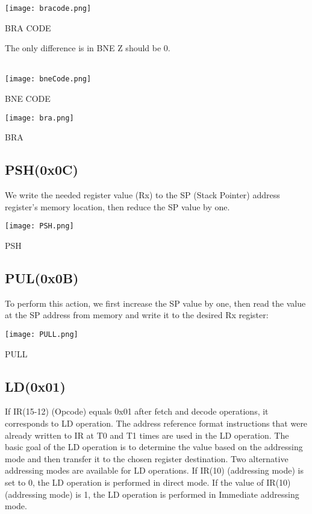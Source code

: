 \documentclass[pdftex,12pt,a4paper]{article}
\begin{document}
\begin{figure3}
	\centering
	\texttt{[image: bracode.png]}
	\caption{BRA CODE}
	\label{fig1}
\end{figure3}

The only difference is in BNE Z should be 0.
\\
\\
\begin{figure10}
	\centering
	\texttt{[image: bneCode.png]}	
	\caption{BNE CODE}
	\label{fig1}
\end{figure10}


\begin{figure4}
	\centering
	\texttt{[image: bra.png]}	
	\caption{BRA}
	\label{fig1}
\end{figure4}


\subsection{PSH(0x0C)}
We write the needed register value (Rx) to the SP (Stack Pointer) address register's memory location, then reduce the SP value by one.

\begin{figure173}
	\centering
	\texttt{[image: PSH.png]}	
	\caption{PSH}
	\label{fig0}
\end{figure173}

\subsection{PUL(0x0B)}
To perform this action, we first increase the SP value by one, then read the value at the SP address from memory and write it to the desired Rx register:

\begin{figure182}
	\centering
	\texttt{[image: PULL.png]}	
	\caption{PULL}
	\label{fig0}
\end{figure182}

\subsection{LD(0x01)}
If IR(15-12) (Opcode) equals 0x01 after fetch and decode operations, it corresponds to LD operation. The address reference format instructions that were already written to IR at T0 and T1 times are used in the LD operation. The basic goal of the LD operation is to determine the value based on the addressing mode and then transfer it to the chosen register destination. Two alternative addressing modes are available for LD operations. If IR(10) (addressing mode) is set to 0, the LD operation is performed in direct mode.
If the value of IR(10) (addressing mode) is 1, the LD operation is performed in Immediate addressing mode.
\end{document}
